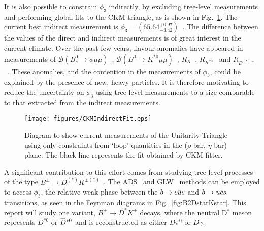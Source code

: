 \documentclass[oneside,12pt]{article}
\newcommand{\overbar}[1]{\mkern 1.5mu\overline{\mkern-1.5mu#1\mkern-1.5mu}\mkern
1.5mu}
\begin{document}
It is also possible to constrain $\phi_3$ indirectly, by excluding tree-level
measurements and performing global fits to the CKM triangle, as is shown in
Fig.~\ref{fig:CKMIndirectFit}. The current best indirect measurement is
$\phi_3=(65.64^{+0.97}_{-3.42})$\degree~\cite{website:CKMFitter}. The
difference between the values of the direct and indirect measurements is of
great interest in the current climate. Over the past few years, flavour
anomalies have appeared in measurements of $\mathcal{B} (B^{0}_{s}\rightarrow
\phi \mu \mu)$~\cite{B2phimumu}, $\mathcal{B} (B^{0}\rightarrow K^{*0} \mu
\mu)$~\cite{B2Kstmumu}, $R_{K}$~\cite{Rk}, $R_{K^{*0}}$~\cite{Rkst} and
$R_{D^{(*)-}}$~\cite{RDst}. These anomalies, and the
contention in the measurements of $\phi_3$, could be explained by the presence
of new, heavy particles. It is therefore motivating to reduce the uncertainty
on $\phi_{3}$ using tree-level measurements to a size comparable to that
extracted from the indirect measurements.
\begin{figure}[htp]
  \vspace*{-4mm}
  \centering \texttt{[image: figures/CKMIndirectFit.eps]}
  \caption{{Diagram to show current measurements of the Unitarity Triangle
      using only constraints from `loop' quantities in the ($\rho$-bar, $\eta$-bar)
  plane. The black line represents the fit obtained by CKM fitter.}}
  \label{fig:CKMIndirectFit} \vspace{-10pt}
\end{figure}
A significant contribution to this effort comes from studying tree-level
processes of the type $B^{\pm}\rightarrow D^{(*)}K^{\pm (*)}$~\cite{B2DKD2hh,
DalitzRun1, DalitzRun2, B2DKstD2hh, B2DstKD2hh}. The ADS~\cite{ADSRef} and
GLW~\cite{GLWRef} methods can be employed to access $\phi_3$, the relative weak
phase between the $b\rightarrow c\overbar{u}s$ and $b\rightarrow u\overbar{c}s$
transitions, as seen in the Feynman diagrams in Fig.~\ref{fig:B2DstarKstar}.
This report will study one variant, $B^{\pm}\rightarrow D^{*}K^{\pm}$ decays,
where the neutral D$^{*}$ meson represents $D^{*0}$ or $\overbar{D}^{*0}$ and
is reconstructed as either $D\pi^{0}$ or $D\gamma$. 
\end{document}
